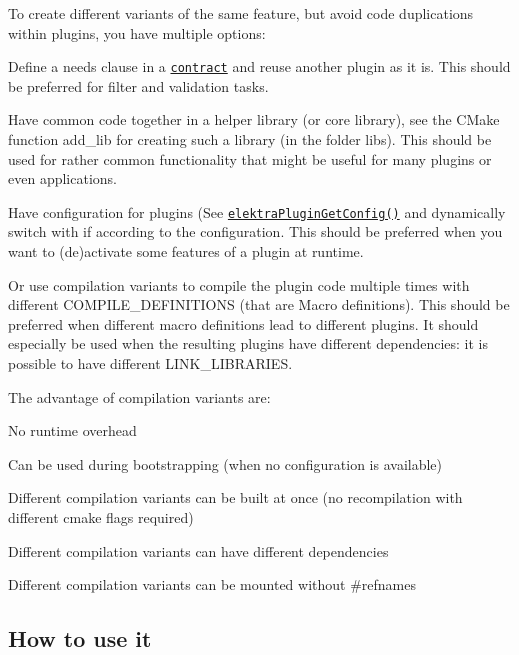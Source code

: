 To create different variants of the same feature, but avoid code duplications within plugins, you have multiple options\+:
\begin{DoxyItemize}
\item Define a needs clause in a \href{/home/markus/Projekte/Elektra/current/doc/CONTRACT.ini}{\tt contract} and reuse another plugin as it is. This should be preferred for filter and validation tasks.
\item Have common code together in a helper library (or core library), see the C\+Make function add\+\_\+lib for creating such a library (in the folder libs). This should be used for rather common functionality that might be useful for many plugins or even applications.
\item Have configuration for plugins (See \href{http://doc.libelektra.org/api/latest/html/group__plugin.html}{\tt elektra\+Plugin\+Get\+Config()} and dynamically switch with if according to the configuration. This should be preferred when you want to (de)activate some features of a plugin at runtime.
\item Or use compilation variants to compile the plugin code multiple times with different {\ttfamily C\+O\+M\+P\+I\+L\+E\+\_\+\+D\+E\+F\+I\+N\+I\+T\+I\+O\+N\+S} (that are Macro definitions). This should be preferred when different macro definitions lead to different plugins. It should especially be used when the resulting plugins have different dependencies\+: it is possible to have different {\ttfamily L\+I\+N\+K\+\_\+\+L\+I\+B\+R\+A\+R\+I\+E\+S}.
\end{DoxyItemize}

The advantage of compilation variants are\+:
\begin{DoxyItemize}
\item No runtime overhead
\item Can be used during bootstrapping (when no configuration is available)
\item Different compilation variants can be built at once (no recompilation with different cmake flags required)
\item Different compilation variants can have different dependencies
\item Different compilation variants can be mounted without {\ttfamily \#refnames}
\end{DoxyItemize}

\subsection*{How to use it}

